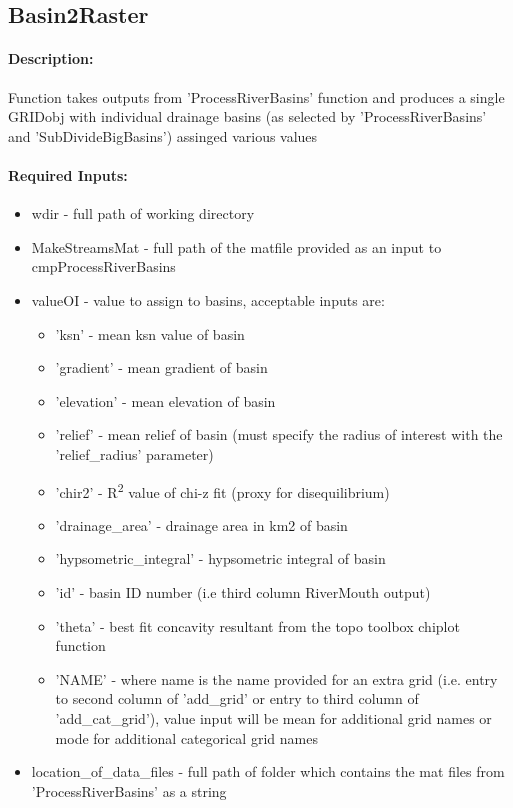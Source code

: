 \subsection{Basin2Raster}
\paragraph{Description:}
Function takes outputs from 'ProcessRiverBasins' function and produces a single GRIDobj with individual drainage
basins (as selected by 'ProcessRiverBasins' and 'SubDivideBigBasins') assinged various values

\paragraph{Required Inputs:}
\begin{itemize}
\item wdir - full path of working directory
\item MakeStreamsMat - full path of the matfile provided as an input to cmpProcessRiverBasins
\item valueOI - value to assign to basins, acceptable inputs are:
\begin{itemize}
\item 'ksn' - mean ksn value of basin
\item 'gradient' - mean gradient of basin
\item 'elevation' - mean elevation of basin
\item 'relief' - mean relief of basin (must specify the radius of interest with the 'relief\_radius' parameter)
\item 'chir2' - R\textsuperscript{2} value of chi-z fit (proxy for disequilibrium)
\item 'drainage\_area' - drainage area in km2 of basin
\item 'hypsometric\_integral' - hypsometric integral of basin
\item 'id' - basin ID number (i.e third column RiverMouth output)
\item 'theta' - best fit concavity resultant from the topo toolbox chiplot function 
\item 'NAME' - where name is the name provided for an extra grid (i.e. entry to second column of 'add\_grid' or entry to 
third column of 'add\_cat\_grid'), value input will be mean for additional grid names or mode for additional 
categorical grid names
\end{itemize}
\item location\_of\_data\_files - full path of folder which contains the mat files from 'ProcessRiverBasins' as a string
\end{itemize}

